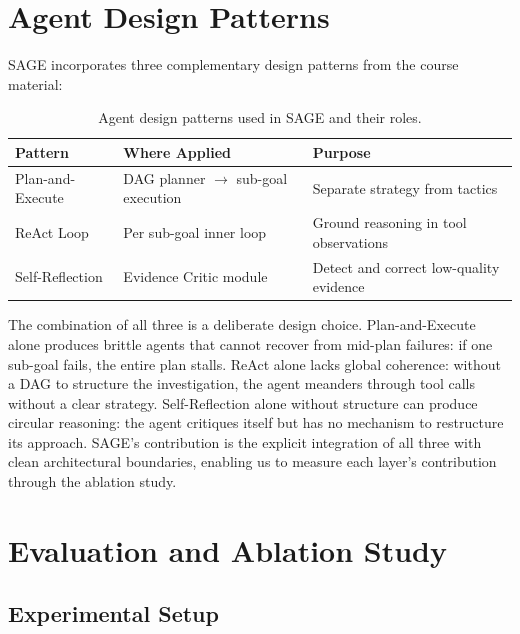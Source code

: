 \documentclass[11pt]{article}
\begin{document}
\section{Agent Design Patterns}

SAGE incorporates three complementary design patterns from the course material:

\begin{table}[H]
\centering
\caption{Agent design patterns used in SAGE and their roles.}
\label{tab:patterns}
\small
\begin{tabular}{@{}lll@{}}
\toprule
\textbf{Pattern} & \textbf{Where Applied} & \textbf{Purpose} \\
\midrule
Plan-and-Execute & DAG planner $\to$ sub-goal execution & Separate strategy from tactics \\
ReAct Loop       & Per sub-goal inner loop              & Ground reasoning in tool observations \\
Self-Reflection  & Evidence Critic module               & Detect and correct low-quality evidence \\
\bottomrule
\end{tabular}
\end{table}

The combination of all three is a deliberate design choice. Plan-and-Execute alone produces brittle agents that cannot recover from mid-plan failures: if one sub-goal fails, the entire plan stalls. ReAct alone lacks global coherence: without a DAG to structure the investigation, the agent meanders through tool calls without a clear strategy. Self-Reflection alone without structure can produce circular reasoning: the agent critiques itself but has no mechanism to restructure its approach. SAGE's contribution is the explicit integration of all three with clean architectural boundaries, enabling us to measure each layer's contribution through the ablation study.

\section{Evaluation and Ablation Study}

\subsection{Experimental Setup}
\end{document}
